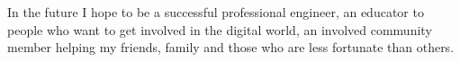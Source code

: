
In the future I hope to be a successful professional engineer,
an educator to people who want to get involved in the digital world,
an involved community member helping my friends, family and those who are less fortunate than others.
